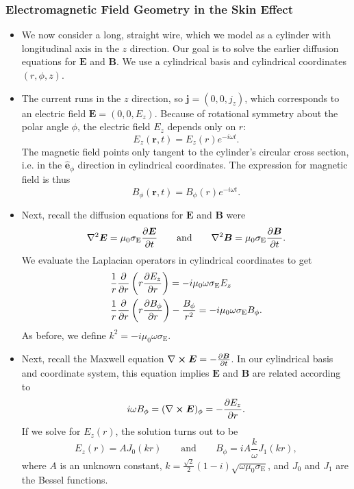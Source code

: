 \documentclass[11pt, a4paper]{article}
\newcommand{\eqtext}[1]{\qquad \text{#1} \qquad}
\renewcommand{\vec}[1]{\bm{#1}} %
\newcommand{\uvec}[1]{\hat{\vec{#1}}} %
\renewcommand{\r}{\vec{r}}
\newcommand{\E}{\vec{E}} %
\newcommand{\B}{\vec{B}} %
\newcommand{\mm}{\mu_{0}}  %
\renewcommand{\j}{\vec{j}}  %
\renewcommand{\curl}{\nabla \cross}
\renewcommand{\laplacian}{\nabla^{2}}
\begin{document}
\subsubsection{Electromagnetic Field Geometry in the Skin Effect}
\begin{itemize}
	\item We now consider a long, straight wire, which we model as a cylinder with longitudinal axis in the $ z $ direction. Our goal is to solve the earlier diffusion equations for $ \E $ and $ \B $. We use a cylindrical basis and cylindrical coordinates $ (r, \phi, z) $. 
	
	\item The current runs in the $ z $ direction, so $ \j = (0, 0, j_{z}) $, which corresponds to an electric field $ \E = (0, 0, E_{z}) $. Because of rotational symmetry about the polar angle $ \phi $, the electric field $ E_{z} $ depends only on $ r $:
	\begin{equation*}
		E_{z}(\r, t) = E_{z}(r)e^{-i\omega t}.
	\end{equation*}
	The magnetic field points only tangent to the cylinder's circular cross section, i.e. in the $ \uvec{e}_{\phi} $ direction in cylindrical coordinates. The expression for magnetic field is thus
	\begin{equation*}
		B_{\phi}(\r, t) = B_{\phi}(r)e^{-i\omega t}.
	\end{equation*}
	
    \item Next, recall the diffusion equations for $ \E $ and $ \B $ were
	\begin{equation*}
		\laplacian \E = \mm \sigma_{\text{E}}\pdv{\E}{t} \eqtext{and} \laplacian \B = \mm \sigma_{\text{E}} \pdv{\B}{t}.
	\end{equation*}
	We evaluate the Laplacian operators in cylindrical coordinates to get
	\begin{align*}
		& \frac{1}{r}\pdv{r}\left(r\pdv{E_{z}}{r}\right)  = -i \mm \omega \sigma_{\text{E}}E_{z} \\
		& \frac{1}{r}\pdv{r}\left(r\pdv{B_{\phi}}{r}\right) - \frac{B_{\phi}}{r^{2}} = -i \mm \omega \sigma_{\text{E}}B_{\phi}.
	\end{align*}
	As before, we define $ k^{2} = -i\mm \omega \sigma_{\text{E}} $. 

    \item Next, recall the Maxwell equation $ \curl \E = - \pdv{\B}{t} $. In our cylindrical basis and coordinate system, this equation implies $ \E $ and $ \B $ are related according to
	\begin{equation*}
		i \omega B_{\phi} = (\curl \E)_{\phi} = -\pdv{E_{z}}{r}.
	\end{equation*}
	If we solve for $ E_{z}(r) $, the solution turns out to be
	\begin{equation*}
		E_{z}(r) = A J_{0}(kr) \eqtext{and} B_{\phi} = i A \frac{k}{\omega} J_{1}(kr),
	\end{equation*}
	where $ A $ is an unknown constant, $ k = \frac{\sqrt{2}}{2}(1- i)\sqrt{\omega \mm \sigma_{\text{E}}} $,	and $ J_{0} $ and $ J_{1} $ are the Bessel functions.
	
\end{itemize}
\end{document}
